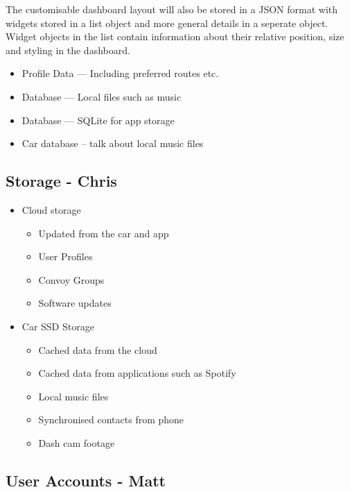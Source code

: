\documentclass{article}
\begin{document}
The customisable dashboard layout will also be stored in a JSON format with widgets stored in a list object and more general details in a seperate object. Widget objects in the list contain information about their relative position, size and styling in the dashboard.




\begin{itemize}
  \item Profile Data --- Including preferred routes etc.
  \item Database --- Local files such as music
  \item Database --- SQLite for app storage
  \item Car database -- talk about local music files
\end{itemize}

\subsection{Storage - Chris}\label{ssec:storage}
\begin{itemize}
  \item Cloud storage%
    \begin{itemize}
      \item Updated from the car and app
      \item User Profiles
      \item Convoy Groups
      \item Software updates
    \end{itemize}
  \item Car SSD Storage
    \begin{itemize}
      \item Cached data from the cloud
      \item Cached data from applications such as Spotify
      \item Local music files
      \item Synchronised contacts from phone
      \item Dash cam footage
    \end{itemize}
\end{itemize}

\subsection{User Accounts - Matt}\label{ssec:user-accounts} 
\end{document}
